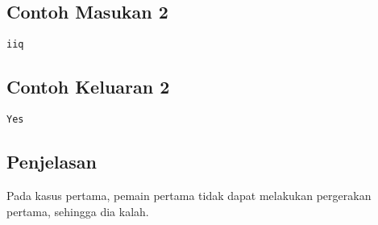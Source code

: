 \documentclass{article}
\begin{document}
\begin{multicols}{2}
\subsection*{Contoh Masukan 2}
\begin{lstlisting}
iiq
\end{lstlisting}
\vfill
\null
\columnbreak
\subsection*{Contoh Keluaran 2}
\begin{lstlisting}
Yes
\end{lstlisting}
\vfill
\null
\end{multicols}

\subsection*{Penjelasan}

Pada kasus pertama, pemain pertama tidak dapat melakukan pergerakan pertama, sehingga dia kalah.
\end{document}
